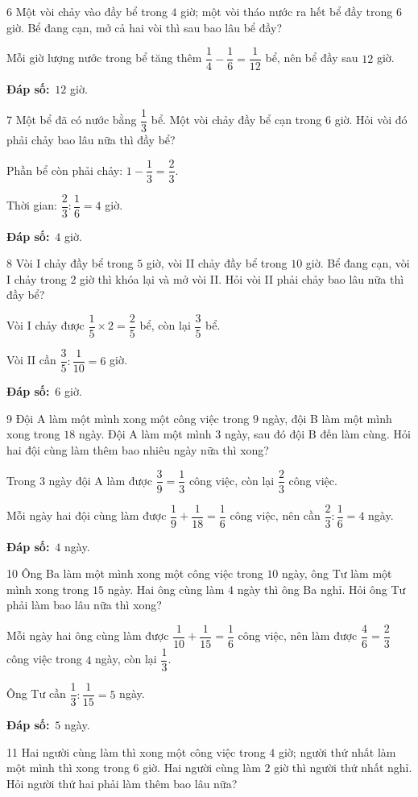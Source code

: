 \documentclass[11pt]{article}
\newif\ifsol \solfalse
\providecommand{\AnsWord}{Đáp số}
\newcommand{\dapso}[1]{\par\textbf{\AnsWord:}\ #1}
\newcommand{\probsol}[1]{%
  \begin{lrbox}{\solmeasure}\begin{minipage}{\dimexpr\linewidth-24pt\relax}#1\end{minipage}\end{lrbox}%
  \ifsol
    \begin{solbox}#1\end{solbox}%
  \else
    \setlength{\solht}{\dimexpr\ht\solmeasure+\dp\solmeasure+0.85cm\relax}%
    \ifdim\solht<1.35cm\setlength{\solht}{1.35cm}\fi
    \begin{tcolorbox}[colback=white,colframe=Line,boxrule=0.8pt,arc=5pt,
      left=8pt,right=8pt,top=4pt,bottom=4pt,height=\solht]{\footnotesize\color{Slate}\itshape\WorkWord}\end{tcolorbox}%
  \fi}
\newcommand{\gap}{\vspace{0.3cm}}
\def\WorkWord{Bài làm:}
\def\AnsWord{Đáp số}
\begin{document}
\gap
\begin{probbox}{6}{\relax}
Một vòi chảy vào đầy bể trong $4$ giờ; một vòi tháo nước ra hết bể đầy trong $6$ giờ. Bể đang cạn, mở cả hai vòi thì sau bao lâu bể đầy?
\end{probbox}
\probsol{
Mỗi giờ lượng nước trong bể tăng thêm $\dfrac14-\dfrac16=\dfrac1{12}$ bể, nên bể đầy sau $12$ giờ.
\dapso{$12$ giờ.}}
\gap
\begin{probbox}{7}{\relax}
Một bể đã có nước bằng $\dfrac13$ bể. Một vòi chảy đầy bể cạn trong $6$ giờ. Hỏi vòi đó phải chảy bao lâu nữa thì đầy bể?
\end{probbox}
\probsol{
Phần bể còn phải chảy: $1-\dfrac13=\dfrac23$.\par Thời gian: $\dfrac23:\dfrac16=4$ giờ.
\dapso{$4$ giờ.}}
\gap
\begin{probbox}{8}{\relax}
Vòi I chảy đầy bể trong $5$ giờ, vòi II chảy đầy bể trong $10$ giờ. Bể đang cạn, vòi I chảy trong $2$ giờ thì khóa lại và mở vòi II. Hỏi vòi II phải chảy bao lâu nữa thì đầy bể?
\end{probbox}
\probsol{
Vòi I chảy được $\dfrac15\times2=\dfrac25$ bể, còn lại $\dfrac35$ bể.\par Vòi II cần $\dfrac35:\dfrac1{10}=6$ giờ.
\dapso{$6$ giờ.}}
\gap
\begin{probbox}{9}{\relax}
Đội A làm một mình xong một công việc trong $9$ ngày, đội B làm một mình xong trong $18$ ngày. Đội A làm một mình $3$ ngày, sau đó đội B đến làm cùng. Hỏi hai đội cùng làm thêm bao nhiêu ngày nữa thì xong?
\end{probbox}
\probsol{
Trong $3$ ngày đội A làm được $\dfrac39=\dfrac13$ công việc, còn lại $\dfrac23$ công việc.\par
Mỗi ngày hai đội cùng làm được $\dfrac19+\dfrac1{18}=\dfrac16$ công việc, nên cần $\dfrac23:\dfrac16=4$ ngày.
\dapso{$4$ ngày.}}
\gap
\begin{probbox}{10}{\relax}
Ông Ba làm một mình xong một công việc trong $10$ ngày, ông Tư làm một mình xong trong $15$ ngày. Hai ông cùng làm $4$ ngày thì ông Ba nghỉ. Hỏi ông Tư phải làm bao lâu nữa thì xong?
\end{probbox}
\probsol{
Mỗi ngày hai ông cùng làm được $\dfrac1{10}+\dfrac1{15}=\dfrac16$ công việc, nên làm được $\dfrac46=\dfrac23$ công việc trong $4$ ngày, còn lại $\dfrac13$.\par
Ông Tư cần $\dfrac13:\dfrac1{15}=5$ ngày.
\dapso{$5$ ngày.}}
\gap
\begin{probbox}{11}{\relax}
Hai người cùng làm thì xong một công việc trong $4$ giờ; người thứ nhất làm một mình thì xong trong $6$ giờ. Hai người cùng làm $2$ giờ thì người thứ nhất nghỉ. Hỏi người thứ hai phải làm thêm bao lâu nữa?
\end{probbox}
\end{document}
